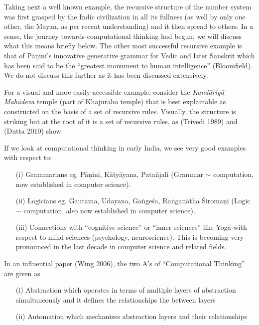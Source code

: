 {Taking next a well known example, the recursive structure of the number system was first grasped by the Indic civilization in all its fullness (as well by only one other, the Mayan, as per recent understanding) and it then spread to others. In a sense, the journey towards computational thinking had begun; we will discuss what this means briefly below. The other most successful recursive example is that of Pāṇini’s innovative generative grammar for Vedic and later Sanskrit which has been said to be the “greatest monument to human intelligence” (Bloomfield). We do not discuss this further as it has been discussed extensively.

For a visual and more easily accessible example, consider the \textsl{Kandāriyā Mahādeva} temple (part of Khajuraho temple) that is best explainable as constructed on the basis of a set of recursive rules. Visually, the structure is striking but at the root of it is a set of recursive rules, as (Trivedi 1989) and (Dutta 2010) show.

If we look at computational thinking in early India, we see very good examples with respect to:
\begin{itemize}
\itemsep=2pt
\item[(i)] Grammarians eg. Pāṇini, Kātyāyana, Patañjali (Grammar $\sim$ computation, now established in computer science).

\item[(ii)] Logicians eg. Gautama, Udayana, Gaṅgeśa, Raṅganātha Śiromaṇi (Logic $\sim$ computation, also now established in computer science).

\item[(iii)] Connections with “cognitive science” or “inner sciences” like Yoga with respect to mind sciences (psychology, neuroscience). This is becoming very pronounced in the last decade in computer science and related fields.
\end{itemize}

In an influential paper (Wing 2006), the two A’s of “Computational Thinking” are given as 
\begin{itemize}
\itemsep=2pt
\item[(i)] Abstraction which operates in terms of multiple layers of abstraction simultaneously and it defines the relationships the between layers

\item[(ii)] Automation which mechanizes abstraction layers and their relationships
\end{itemize}

}
